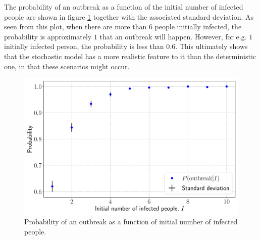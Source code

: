 The probability of an outbreak as a function of the initial number of infected people are shown in figure \ref{fig:prob_outbreak} together with the associated standard deviation. As seen from this plot, when there are more than $6$ people initially infected, the probability is approximately $1$ that an outbreak will happen. However, for e.g. $1$ initially infected person, the probability is less than $0.6$. This ultimately shows that the stochastic model has a more realistic feature to it than the deterministic one, in that these scenarios might occur.

\begin{figure}[htb]
	\centering
	\includegraphics[width=0.8\columnwidth]{../fig/2Bc_prob.pdf}
	\caption{Probability of an outbreak as a function of initial number of infected people.}
	\label{fig:prob_outbreak}
\end{figure}

\clearpage